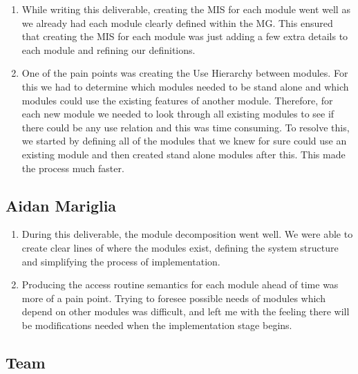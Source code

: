 \documentclass[12pt, titlepage]{article}
\begin{document}
\begin{enumerate}
    \item While writing this deliverable, creating the MIS for each module went well as we already had each module clearly defined within the MG. This ensured that creating the MIS for each module was just adding a few extra details to each module and refining our definitions. 
    
    \item One of the pain points was creating the Use Hierarchy between modules. For this we had to determine which modules needed to be stand alone and which modules could use the existing features of another module. Therefore, for each new module we needed to look through all existing modules to see if there could be any use relation and this was time consuming. To resolve this, we started by defining all of the modules that we knew for sure could use an existing module and then created stand alone modules after this. This made the process much faster. 
\end{enumerate}

\subsection*{Aidan Mariglia}

\begin{enumerate}
    \item During this deliverable, the module decomposition went well. We were able to create clear lines of where the modules exist, defining the system structure and simplifying the process of implementation.
    
    \item Producing the access routine semantics for each module ahead of time was more of a pain point. Trying to foresee possible needs of modules which depend on other modules was difficult, and left me with the feeling there will be modifications needed when the implementation stage begins. 
\end{enumerate}

\subsection*{Team} 
\end{document}
